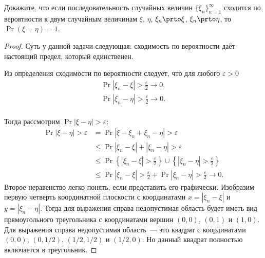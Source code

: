 \begin{problem}
    Докажите, что если последовательность случайных величин \(\{\xi_n\}_{n = 1}^{\infty}\) сходится по вероятности к двум случайным величинам \(\xi\), \(\eta\), \(\xi_n \prto \xi\), \(\xi_n \prto \eta\), то \(\Pr(\xi = \eta) = 1\).
\end{problem}
\begin{proof}
    Суть у данной задачи следующая: сходимость по вероятности даёт настоящий предел, который единственен.
    
    Из определения сходимости по вероятности следует, что для любого \(\varepsilon > 0\)
    \[
    \begin{aligned}
    \Pr{|\xi_n - \xi| > \frac{\varepsilon}{2}} \to 0, \\
    \Pr{|\xi_n - \eta| > \frac{\varepsilon}{2}} \to 0. \\
    \end{aligned}
    \]
    
    Тогда рассмотрим \(\Pr{|\xi - \eta| > \varepsilon}\):
    \[\begin{aligned}
        \Pr{|\xi - \eta| > \varepsilon} &= \Pr{|\xi - \xi_n + \xi_n - \eta| > \varepsilon} \\
        &\leq \Pr{|\xi_n - \xi| + |\xi_n - \eta| > \varepsilon} \\
        &\leq \Pr{\left\{|\xi_n - \xi| > \frac{\varepsilon}{2}\right\} \cup \left\{|\xi_n - \eta| > \frac{\varepsilon}{2}\right\}} \\ 
        &\leq \Pr{|\xi_n - \xi| > \frac{\varepsilon}{2}} + \Pr{|\xi_n - \eta| > \frac{\varepsilon}{2}} \to 0.
    \end{aligned}\]
    Второе неравенство легко понять, если представить его графически. Изобразим первую четверть координатной плоскости с координатами \(x = |\xi_n - \xi|\) и \(y = |\xi_n - \eta|\). Тогда для выражения справа недопустимая область будет иметь вид прямоугольного треугольника с координатами вершин \((0, 0)\), \((0, 1)\) и \((1, 0)\). Для выражения справа недопустимая область~--- это квадрат с координатами \((0,0)\), \((0, 1/2)\), \((1/2, 1/2)\) и \((1/2, 0)\). Но данный квадрат полностью включается в треугольник.
\end{proof}

